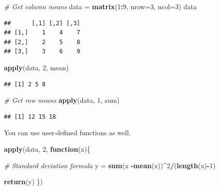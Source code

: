 \documentclass[
]{book}
\newenvironment{Shaded}{\begin{snugshade}}{\end{snugshade}}
\newcommand{\CommentTok}[1]{\textcolor[rgb]{0.56,0.35,0.01}{\textit{#1}}}
\newcommand{\ControlFlowTok}[1]{\textcolor[rgb]{0.13,0.29,0.53}{\textbf{#1}}}
\newcommand{\DataTypeTok}[1]{\textcolor[rgb]{0.13,0.29,0.53}{#1}}
\newcommand{\DecValTok}[1]{\textcolor[rgb]{0.00,0.00,0.81}{#1}}
\newcommand{\KeywordTok}[1]{\textcolor[rgb]{0.13,0.29,0.53}{\textbf{#1}}}
\newcommand{\NormalTok}[1]{#1}
\newcommand{\OperatorTok}[1]{\textcolor[rgb]{0.81,0.36,0.00}{\textbf{#1}}}
\newcommand{\StringTok}[1]{\textcolor[rgb]{0.31,0.60,0.02}{#1}}
\begin{document}
\begin{Shaded}
\begin{Highlighting}[]
\CommentTok{# Get column means }
\NormalTok{data =}\StringTok{ }\KeywordTok{matrix}\NormalTok{(}\DecValTok{1}\OperatorTok{:}\DecValTok{9}\NormalTok{, }\DataTypeTok{nrow=}\DecValTok{3}\NormalTok{, }\DataTypeTok{ncol=}\DecValTok{3}\NormalTok{)}
\NormalTok{data}
\end{Highlighting}
\end{Shaded}

\begin{verbatim}
##      [,1] [,2] [,3]
## [1,]    1    4    7
## [2,]    2    5    8
## [3,]    3    6    9
\end{verbatim}

\begin{Shaded}
\begin{Highlighting}[]
\KeywordTok{apply}\NormalTok{(data, }\DecValTok{2}\NormalTok{, mean)}
\end{Highlighting}
\end{Shaded}

\begin{verbatim}
## [1] 2 5 8
\end{verbatim}

\begin{Shaded}
\begin{Highlighting}[]
\CommentTok{# Get row means }
\KeywordTok{apply}\NormalTok{(data, }\DecValTok{1}\NormalTok{, sum)}
\end{Highlighting}
\end{Shaded}

\begin{verbatim}
## [1] 12 15 18
\end{verbatim}

You can use user-defined functions as well.

\begin{Shaded}
\begin{Highlighting}[]
\KeywordTok{apply}\NormalTok{(data, }\DecValTok{2}\NormalTok{, }\ControlFlowTok{function}\NormalTok{(x)\{}
  
  \CommentTok{# Standard deviation formula }
\NormalTok{  y =}\StringTok{ }\KeywordTok{sum}\NormalTok{(x }\OperatorTok{-}\KeywordTok{mean}\NormalTok{(x))}\OperatorTok{^}\DecValTok{2}\OperatorTok{/}\NormalTok{(}\KeywordTok{length}\NormalTok{(x)}\OperatorTok{-}\DecValTok{1}\NormalTok{)}
  
  \KeywordTok{return}\NormalTok{(y)}
\NormalTok{  \})}
\end{Highlighting}
\end{Shaded}
\end{document}
